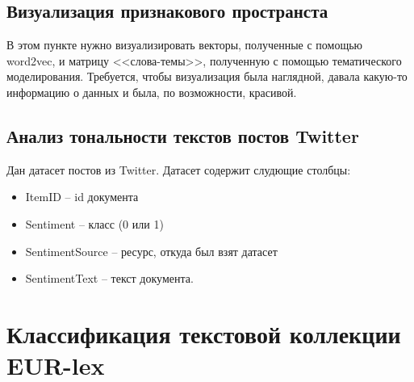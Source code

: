 \documentclass[12pt, a4paper]{article}
\begin{document}
        \subsection{Визуализация признакового пространста}
            В этом пункте нужно визуализировать векторы, полученные с помощью word2vec, и матрицу <<слова-темы>>, полученную с помощью тематического моделирования. Требуется, чтобы визуализация была наглядной, давала какую-то информацию о данных и была, по возможности, красивой.

        \subsection{Анализ тональности текстов постов Twitter}
            Дан датасет постов из Twitter. Датасет содержит слудющие столбцы:
            \begin{itemize}
                \item ItemID -- id документа
                \item Sentiment -- класс (0 или 1)
                \item SentimentSource -- ресурс, откуда был взят датасет
                \item SentimentText -- текст документа.
            \end{itemize}

    \section{Классификация текстовой коллекции EUR-lex}
\end{document}
